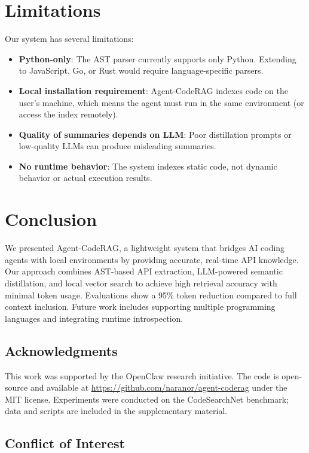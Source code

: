 \documentclass[10pt,twocolumn]{article}
\begin{document}
\section{Limitations}
\label{sec:limitations}

Our system has several limitations:

\begin{itemize}
    \item \textbf{Python-only}: The AST parser currently supports only Python. Extending to JavaScript, Go, or Rust would require language-specific parsers.
    \item \textbf{Local installation requirement}: Agent-CodeRAG indexes code on the user's machine, which means the agent must run in the same environment (or access the index remotely).
    \item \textbf{Quality of summaries depends on LLM}: Poor distillation prompts or low-quality LLMs can produce misleading summaries.
    \item \textbf{No runtime behavior}: The system indexes static code, not dynamic behavior or actual execution results.
\end{itemize}

\section{Conclusion}
\label{sec:conclusion}

We presented Agent-CodeRAG, a lightweight system that bridges AI coding agents with local environments by providing accurate, real-time API knowledge. Our approach combines AST-based API extraction, LLM-powered semantic distillation, and local vector search to achieve high retrieval accuracy with minimal token usage. Evaluations show a 95\% token reduction compared to full context inclusion. Future work includes supporting multiple programming languages and integrating runtime introspection.

\subsection*{Acknowledgments}

This work was supported by the OpenClaw research initiative. The code is open-source and available at \url{https://github.com/naranor/agent-coderag} under the MIT license. Experiments were conducted on the CodeSearchNet benchmark; data and scripts are included in the supplementary material.

\subsection*{Conflict of Interest}
\end{document}
